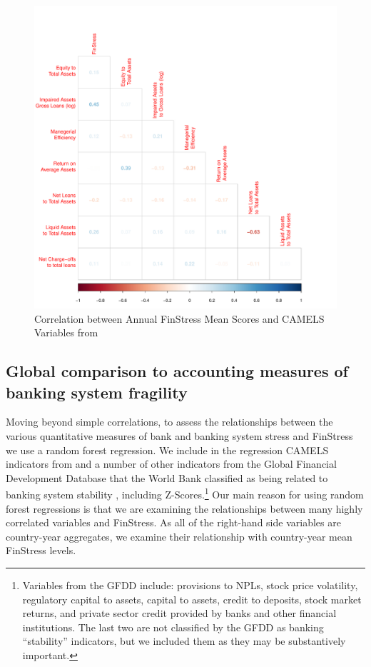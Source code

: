 \documentclass[]{article}
\begin{document}
\begin{figure}[H]
	\caption{Correlation between Annual FinStress Mean Scores and CAMELS Variables from \cite{Andrianova2015}}
    \label{cor_camel}
    \begin{center}
    	\includegraphics[scale=0.5]{figures/ff_corr_matrix.pdf}
    \end{center}
\end{figure}

\subsection*{Global comparison to accounting measures of banking system fragility}

Moving beyond simple correlations, to assess the relationships between the various quantitative measures of bank and banking system stress and FinStress we use a random forest regression. We include in the regression CAMELS indicators from \cite{Andrianova2015} and a number of other indicators from the Global Financial Development Database that the World Bank classified as being related to banking system stability \citep{worldbank2015}, including Z-Scores.\footnote{Variables from the GFDD include: provisions to NPLs, stock price volatility, regulatory capital to assets, capital to assets, credit to deposits, stock market returns, and private sector credit provided by banks and other financial institutions. The last two are not classified by the GFDD as banking ``stability'' indicators, but we included them as they may be substantively important.} Our main reason for using random forest regressions is that we are examining the relationships between many highly correlated variables and FinStress. As all of the right-hand side variables are country-year aggregates, we examine their relationship with country-year mean FinStress levels.
\end{document}
